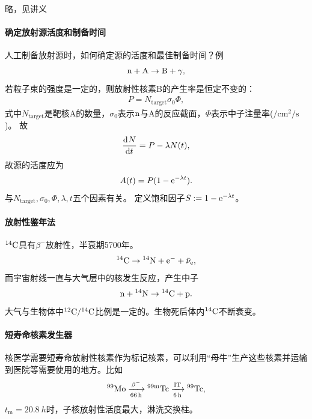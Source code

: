 略，见讲义

\paragraph{确定放射源活度和制备时间}

人工制备放射源时，如何确定源的活度和最佳制备时间？例
\[
	\mathrm n + \mathrm{A} \to \mathrm{B} + \gamma,
\]
若粒子束的强度是一定的，则放射性核素B的产生率是恒定不变的：
\begin{align}
	P = N_{\mathrm{target}}\sigma_0\Phi,
\end{align}
式中$N_{\mathrm{target}}$是靶核A的数量，$\sigma_0$表示$\mathrm n$与A的反应截面，$\Phi$表示中子注量率($\unit{\per\centi\metre\squared\per\second}$)。
故
\begin{equation}\label{eq:nrd-activation-balance}
	\frac{\mathop{}\!\mathrm{d}^{}N}{\mathrm{d}{t}^{}} = P - \lambda N(t),
\end{equation}
故源的活度应为
\begin{align}
	A(t) = P(1 - \mathop{}\!\mathrm{e}^{-\lambda t}).
\end{align}
与$N_{\mathrm{target}},\sigma_0,\Phi,\lambda,t$五个因素有关。
定义饱和因子$S := 1 - \mathop{}\!\mathrm{e}^{-\lambda t}$。

\paragraph{放射性鉴年法}

$\nuclide{14}C$具有$\beta^-$放射性，半衰期5700年。
\[
	\nuclide{14}C \to \nuclide{14}N + \electron^- + \bar\nu_\electron,
\]
而宇宙射线一直与大气层中的核发生反应，产生中子
\[
	\neutron + \nuclide{14}N \to \nuclide{14}C + \proton.
\]
大气与生物体中$\nuclide{12}C/\nuclide{14}C$比例是一定的。生物死后体内$\nuclide{14}C$不断衰变。
\paragraph{短寿命核素发生器}

核医学需要短寿命放射性核素作为标记核素，可以利用“母牛”生产这些核素并运输到医院等需要使用的地方。比如
\[
	\nuclide{99}{Mo}\decayto[\qty{66}{h}]{\beta^-}\nuclide{99\mathrm m}{Tc}\decayto[\qty{6}{h}]{\mathrm{IT}}\nuclide{99}{Tc},
\]
$t_\mathrm m = \qty{20.8}{h}$时，子核放射性活度最大，淋洗交换柱。

